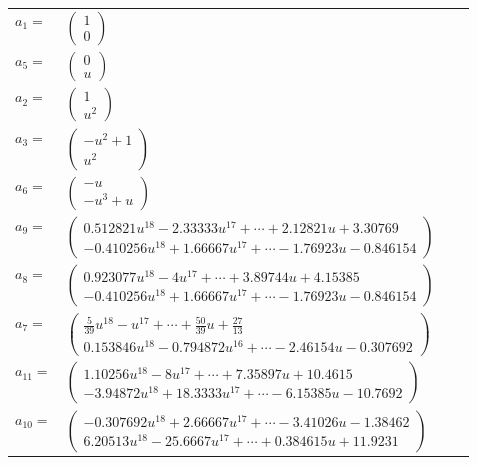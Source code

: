 \documentclass[1p]{elsarticle_modified}
\theoremstyle{definition}
\begin{document}
\begin{tabular}{m{7pt} m{180pt} m{7pt} m{180pt} }
\flushright $a_{1}=$&$\begin{pmatrix}1\\0\end{pmatrix}$ \\
\flushright $a_{5}=$&$\begin{pmatrix}0\\u\end{pmatrix}$ \\
\flushright $a_{2}=$&$\begin{pmatrix}1\\u^2\end{pmatrix}$ \\
\flushright $a_{3}=$&$\begin{pmatrix}- u^2+1\\u^2\end{pmatrix}$ \\
\flushright $a_{6}=$&$\begin{pmatrix}- u\\- u^3+u\end{pmatrix}$ \\
\flushright $a_{9}=$&$\begin{pmatrix}0.512821 u^{18}-2.33333 u^{17}+\cdots+2.12821 u+3.30769\\-0.410256 u^{18}+1.66667 u^{17}+\cdots-1.76923 u-0.846154\end{pmatrix}$ \\
\flushright $a_{8}=$&$\begin{pmatrix}0.923077 u^{18}-4 u^{17}+\cdots+3.89744 u+4.15385\\-0.410256 u^{18}+1.66667 u^{17}+\cdots-1.76923 u-0.846154\end{pmatrix}$ \\
\flushright $a_{7}=$&$\begin{pmatrix}\frac{5}{39} u^{18}- u^{17}+\cdots+\frac{50}{39} u+\frac{27}{13}\\0.153846 u^{18}-0.794872 u^{16}+\cdots-2.46154 u-0.307692\end{pmatrix}$ \\
\flushright $a_{11}=$&$\begin{pmatrix}1.10256 u^{18}-8 u^{17}+\cdots+7.35897 u+10.4615\\-3.94872 u^{18}+18.3333 u^{17}+\cdots-6.15385 u-10.7692\end{pmatrix}$ \\
\flushright $a_{10}=$&$\begin{pmatrix}-0.307692 u^{18}+2.66667 u^{17}+\cdots-3.41026 u-1.38462\\6.20513 u^{18}-25.6667 u^{17}+\cdots+0.384615 u+11.9231\end{pmatrix}$ \\

\end{tabular}
\end{document}
